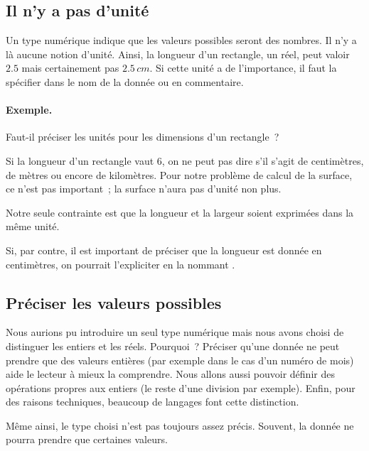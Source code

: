		\subsection{Il n’y a pas d’unité}
	
			Un type numérique indique que les valeurs possibles seront
			des nombres. Il n’y a là aucune notion d’unité.
			Ainsi, la longueur d’un rectangle, un réel, 
			peut valoir $2.5$ mais certainement pas $2.5$\,$cm$.
			Si cette unité a de l’importance,
			il faut la spécifier dans le nom de la donnée ou en commentaire.
			
			\begin{Emphase}
				\paragraph{Exemple.}
				Faut-il préciser les unités 
				pour les dimensions d’un rectangle~?
				
				Si la longueur d’un rectangle vaut $6$, 
				on ne peut pas dire s’il s’agit de centimètres, 
				de mètres ou encore de kilomètres.
				Pour notre problème de calcul de la surface,
				ce n’est pas important~;
				la surface n’aura pas d’unité non plus.

				Notre seule contrainte est que la longueur et la largeur soient
				exprimées dans la même unité.
				
				Si, par contre, 
				il est important de préciser que la longueur
				est donnée en centimètres,
				on pourrait l’expliciter en la nommant
				.	
			\end{Emphase}
	
		\subsection{Préciser les valeurs possibles}
		
			Nous aurions pu introduire un seul type numérique
			mais nous avons choisi de distinguer les entiers et les réels.
			Pourquoi~?
			Préciser qu’une donnée ne peut prendre que des valeurs entières
			(par exemple dans le cas d’un numéro de mois)
			aide le lecteur à mieux la comprendre.
			Nous allons aussi pouvoir définir des opérations propres aux entiers
			(le reste d’une division par exemple).
			Enfin, pour des raisons techniques,
			beaucoup de langages font cette distinction.
			
			Même ainsi, le type choisi n’est pas toujours assez précis.
			Souvent, la donnée ne pourra prendre que certaines valeurs.
			
